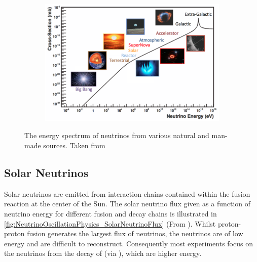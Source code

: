 \begin{figure}[h]
  \begin{subfigure}[t]{0.95\textwidth}
    \includegraphics[width=\textwidth, trim={0mm 0mm 0mm 0mm}, clip,page=1]{Figures/Theory/EnergySpectrum.pdf}
  \end{subfigure}
  \caption{The energy spectrum of neutrinos from various natural and man-made sources. Taken from \cite{Formaggio:2012cpf}}
  \label{fig:NeutrinoOscillationPhysics_EnergySpectrum}
\end{figure}

\subsection{Solar Neutrinos}
\label{subsec:NeutrinoOscillationPhysics_SolarNeutrinos}

Solar neutrinos are emitted from interaction chains contained within the fusion reaction at the center of the Sun. The solar neutrino flux given as a function of neutrino energy for different fusion and decay chains is illustrated in \autoref{fig:NeutrinoOscillationPhysics_SolarNeutrinoFlux} (From \cite{Bellerive2004-ur}). Whilst proton-proton fusion generates the largest flux of neutrinos, the neutrinos are of low energy and are difficult to reconstruct. Consequently most experiments focus on the neutrinos from the decay of  (via ), which are higher energy.

